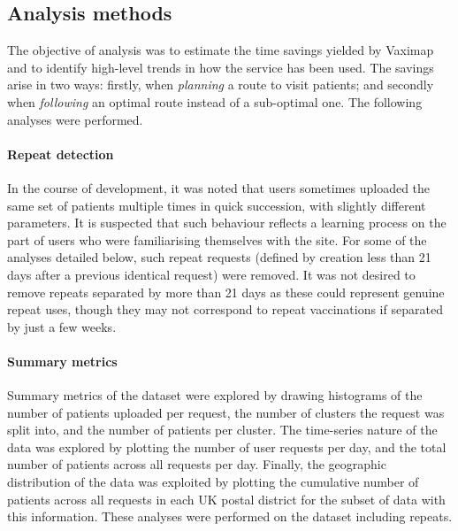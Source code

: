 \documentclass{article}
\def\vm{Vaximap}
\begin{document}
\subsection{Analysis methods}

The objective of analysis was to estimate the time savings yielded by \vm{} and to identify high-level trends in how the service has been used. The savings arise in two ways: firstly, when \textit{planning} a route to visit patients; and secondly when \textit{following} an optimal route instead of a sub-optimal one. The following analyses were performed. 

\paragraph{Repeat detection}
 In the course of development, it was noted that users sometimes uploaded the same set of patients multiple times in quick succession, with slightly different parameters. It is suspected that such behaviour reflects a learning process on the part of users who were familiarising themselves with the site. For some of the analyses detailed below, such repeat requests (defined by creation less than 21 days after a previous identical request) were removed. It was not desired to remove repeats separated by more than 21 days as these could represent genuine repeat uses, though they may not correspond to repeat vaccinations if separated by just a few weeks.

\paragraph{Summary metrics}
Summary metrics of the dataset were explored by drawing histograms of the number of patients uploaded per request, the number of clusters the request was split into, and the number of patients per cluster. The time-series nature of the data was explored by plotting the number of user requests per day, and the total number of patients across all requests per day. Finally, the geographic distribution of the data was exploited by plotting the cumulative number of patients across all requests in each UK postal district for the subset of data with this information. These analyses were performed on the dataset including repeats.
\end{document}
